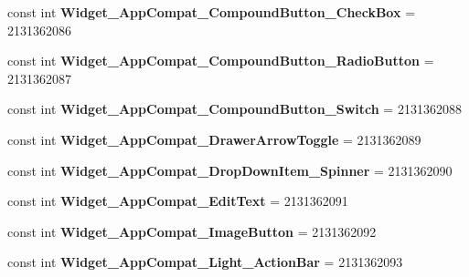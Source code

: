 \begin{DoxyCompactItemize}
const int {\bfseries Widget\+\_\+\+App\+Compat\+\_\+\+Compound\+Button\+\_\+\+Check\+Box} = 2131362086
\item 
\mbox{\label{class_sample_app_1_1_droid_1_1_resource_1_1_style_a9a4d098ad5022722ccfc11bca08349d5}} 
const int {\bfseries Widget\+\_\+\+App\+Compat\+\_\+\+Compound\+Button\+\_\+\+Radio\+Button} = 2131362087
\item 
\mbox{\label{class_sample_app_1_1_droid_1_1_resource_1_1_style_a6205e7f73c5a760996ac98439610ee21}} 
const int {\bfseries Widget\+\_\+\+App\+Compat\+\_\+\+Compound\+Button\+\_\+\+Switch} = 2131362088
\item 
\mbox{\label{class_sample_app_1_1_droid_1_1_resource_1_1_style_a828a01f767f8803e085ed7b041cd3a2b}} 
const int {\bfseries Widget\+\_\+\+App\+Compat\+\_\+\+Drawer\+Arrow\+Toggle} = 2131362089
\item 
\mbox{\label{class_sample_app_1_1_droid_1_1_resource_1_1_style_a8fed1abf588289efa012f006e9f0b3e0}} 
const int {\bfseries Widget\+\_\+\+App\+Compat\+\_\+\+Drop\+Down\+Item\+\_\+\+Spinner} = 2131362090
\item 
\mbox{\label{class_sample_app_1_1_droid_1_1_resource_1_1_style_a0dcd177fda0f126d4474c37af65d36cd}} 
const int {\bfseries Widget\+\_\+\+App\+Compat\+\_\+\+Edit\+Text} = 2131362091
\item 
\mbox{\label{class_sample_app_1_1_droid_1_1_resource_1_1_style_a37fc947f5a96382086f43385cdbea5e7}} 
const int {\bfseries Widget\+\_\+\+App\+Compat\+\_\+\+Image\+Button} = 2131362092
\item 
\mbox{\label{class_sample_app_1_1_droid_1_1_resource_1_1_style_a0d76b489bd862aa2083a6ad9c7770133}} 
const int {\bfseries Widget\+\_\+\+App\+Compat\+\_\+\+Light\+\_\+\+Action\+Bar} = 2131362093
\item 
\mbox{\label{class_sample_app_1_1_droid_1_1_resource_1_1_style_a00c2d00ce9a741d8a414e3726035c75c}} 

\end{DoxyCompactItemize}
